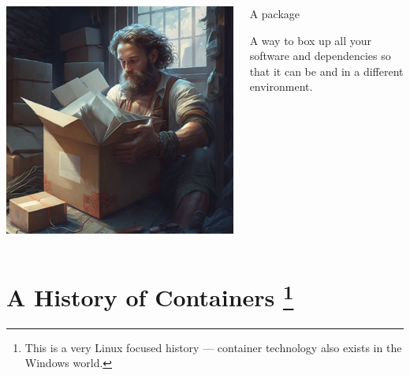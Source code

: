 \documentclass{slide}
\begin{document}
\begin{frame}
    \vspace{-2em}
    \begin{columns}
    \begin{column}{0.6\textwidth}
    \begin{center}
    \includegraphics[height=0.95\textheight]{images/packaging}
    \end{center}
    \end{column}

    \begin{column}{0.4\textwidth}
    {\color{primary}\large A package}
    \vspace{1em}

    A way to box up all your software and dependencies
    so that it can be  and  in a different environment.
    \end{column}
    \end{columns}
\end{frame}

\section{A History of Containers %
\footnote{This is a very Linux focused history --- container technology also exists in the Windows world.}}
\end{document}
